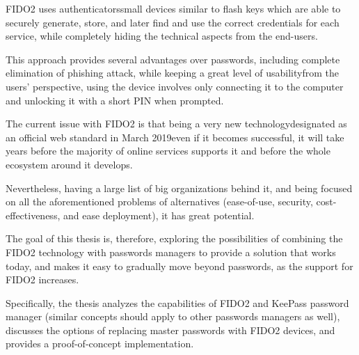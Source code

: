 FIDO2 uses authenticators\textemdash small devices similar to flash keys\textemdash
which are able to securely generate, store, and later find and use the correct credentials for each service,
while completely hiding the technical aspects from the end-users.

This approach provides several advantages over passwords, including complete elimination of phishing attack,
while keeping a great level of usability\textemdash from the users' perspective, using the device involves only connecting it to the computer and unlocking it with a short PIN when prompted.

The current issue with FIDO2 is that being a very new technology\textemdash de\-sig\-na\-ted as an official web standard in March 2019\textemdash even if it becomes successful,
it will take years before the majority of online services supports it and before the whole ecosystem around it develops.

Nevertheless, having a large list of big organizations behind it, and being focused on
all the aforementioned problems of alternatives (ease-of-use, security, cost-effectiveness, and ease deployment),
it has great potential.

The goal of this thesis is, therefore, exploring the possibilities of combining the FIDO2 technology with passwords managers
to provide a solution that works today,
and makes it easy to gradually move beyond passwords, as the support for FIDO2 increases.

Specifically, the thesis analyzes the capabilities of FIDO2 and KeePass password manager
(similar concepts should apply to other passwords managers as well), discusses the options
of replacing master passwords with FIDO2 devices, and provides a proof-of-concept implementation.
